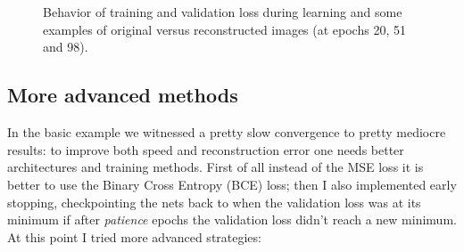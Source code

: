\documentclass[a4paper, 11pt]{article}
\begin{document}
    \begin{figure}
      \centering
       \,
       \\
       \,
      \caption{Behavior of training and validation loss during learning and some examples of original versus reconstructed images (at epochs 20, 51 and 98).}
      \label{fig:basic}
    \end{figure}

  \subsection{More advanced methods}
    In the basic example we witnessed a pretty slow convergence to pretty mediocre results: to improve both speed and reconstruction error one needs better architectures and training methods. First of all instead of the MSE loss it is better to use the Binary Cross Entropy (BCE) loss; then I also implemented early stopping, checkpointing the nets back to when the validation loss was at its minimum if after \emph{patience} epochs the validation loss didn't reach a new minimum. At this point I tried more advanced strategies:
\end{document}

